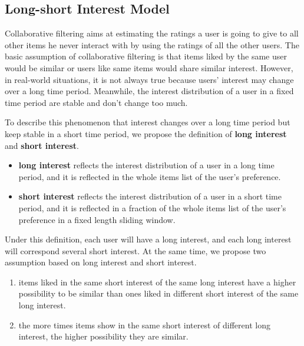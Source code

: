 \documentclass{llncs}
\begin{document}
\subsection{Long-short Interest Model}
Collaborative filtering aims at estimating the ratings a user is going to give to
all other items he never interact with by using the ratings of all the other users.
The basic assumption of collaborative filtering is that items liked by the same user
would be similar or users like same items would share similar interest.
However, in real-world situations, it is not always true because users' interest
may change over a long time period.
Meanwhile, the interest distribution of a user in a fixed time period
are stable and don't change too much.

To describe this phenomenon that interest changes over a long time period but
keep stable in a short time period,
we propose the definition of \textbf{long interest} and \textbf{short interest}.

\begin{itemize}
	\item \textbf{long interest} reflects the interest distribution of a user
	in a long time period, and it is reflected in the whole items list of the user's preference.
	\item \textbf{short interest} reflects the interest distribution of a user
	in a short time period, and it is reflected in a fraction of the whole items list of
	the user's preference in a fixed length sliding window.
\end{itemize}

Under this definition, each user will have a long interest, and each long interest will
correspond several short interest. At the same time,
we propose two assumption based on long interest and short interest.

\begin{enumerate}
	\item items liked in the same short interest of the same long interest have a higher
	possibility to be similar than ones liked in different short interest of the same long interest.
	\item the more times items show in the same short interest of different long interest,
	the higher possibility they are similar.
\end{enumerate}
\end{document}

